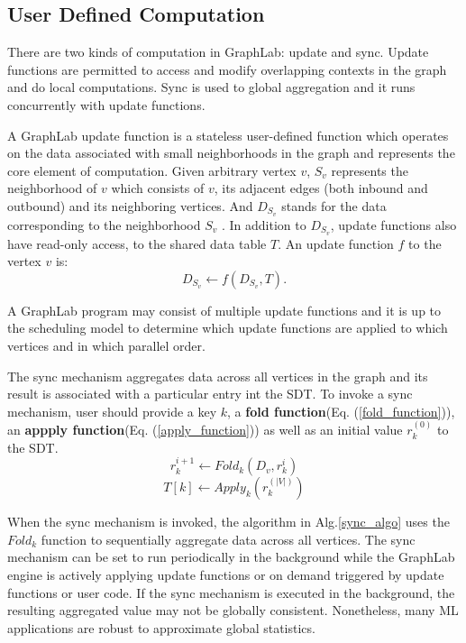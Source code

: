 \documentclass {report}
\begin{document}
\subsection{User Defined Computation}
There are two kinds of computation in GraphLab: update and sync. Update functions are permitted to access and modify overlapping contexts in the graph and do local computations. Sync is used to global aggregation and it runs concurrently with update functions.


A GraphLab update function is a stateless user-defined
function which operates on the data associated with small
neighborhoods in the graph and represents the core element
of computation. Given arbitrary vertex $v$, $S_v$ represents the
neighborhood of $v$ which consists of $v$, its adjacent edges
(both inbound and outbound) and its neighboring vertices. And $D_{S_v}$ stands for the data corresponding to the neighborhood $S_v$
. In addition to $D_{S_v}$, update functions also have read-only access, to the shared
data table $T$. An update function $f$ to the vertex $v$ is:
\begin{equation}
  D_{S_v} \leftarrow f(D_{S_v}, T).
\end{equation}

A GraphLab program may consist of
multiple update functions and it is up to the scheduling
model to determine which update functions
are applied to which vertices and in which parallel order.


The sync mechanism aggregates data across all vertices in
the graph and its result is associated with a particular entry int the SDT. To invoke a sync mechanism, user
should provide a key $k$, a \textbf{fold function}(Eq. (\ref{fold_function})), an \textbf{appply function}(Eq. (\ref{apply_function})) as well as an initial value $r^{(0)}_k$ to the SDT.
\begin{equation}\label{fold_function}
r^{i+1}_k \leftarrow Fold_k (D_v, r^{i}_k)
\end{equation}
\begin{equation}\label{apply_function}
  T[k] \leftarrow Apply_k(r_k^{(|V|)})
\end{equation}

When the sync mechanism is invoked, the algorithm in
Alg.\ref{sync_algo} uses the $Fold_k $
function to sequentially aggregate
data across all vertices. The sync mechanism can be set to run periodically in the
background while the GraphLab engine is actively applying update functions or on demand triggered by update
functions or user code. If the sync mechanism is executed
in the background, the resulting aggregated value may not
be globally consistent. Nonetheless, many ML applications
are robust to approximate global statistics.
\end{document}
